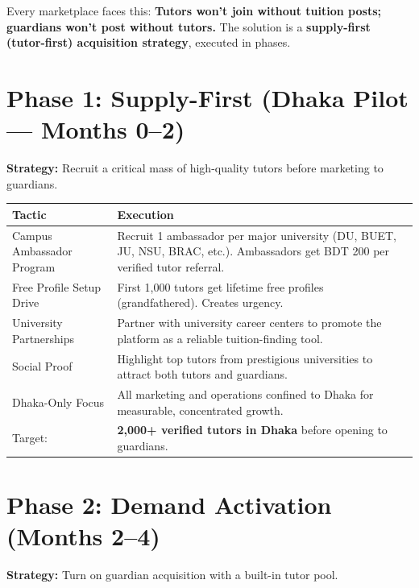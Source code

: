 \documentclass[12pt,a4paper,twoside]{report}
\begin{document}
Every marketplace faces this: \textbf{Tutors won't join without tuition posts; guardians won't post without tutors.} The solution is a \textbf{supply-first (tutor-first) acquisition strategy}, executed in phases.

\section{Phase 1: Supply-First (Dhaka Pilot — Months 0--2)}

\textbf{Strategy:} Recruit a critical mass of high-quality tutors before marketing to guardians.

\begin{longtable}{p{3cm}|p{10cm}}
\toprule
\textbf{Tactic} & \textbf{Execution} \\
\midrule
\endhead
\bottomrule
\endfoot
Campus Ambassador Program & Recruit 1 ambassador per major university (DU, BUET, JU, NSU, BRAC, etc.). Ambassadors get BDT 200 per verified tutor referral. \\
Free Profile Setup Drive & First 1,000 tutors get lifetime free profiles (grandfathered). Creates urgency. \\
University Partnerships & Partner with university career centers to promote the platform as a reliable tuition-finding tool. \\
Social Proof & Highlight top tutors from prestigious universities to attract both tutors and guardians. \\
Dhaka-Only Focus & All marketing and operations confined to Dhaka for measurable, concentrated growth. \\
Target: & \textbf{2,000+ verified tutors in Dhaka} before opening to guardians. \\
\bottomrule
\end{longtable}

\section{Phase 2: Demand Activation (Months 2--4)}

\textbf{Strategy:} Turn on guardian acquisition with a built-in tutor pool.
\end{document}
